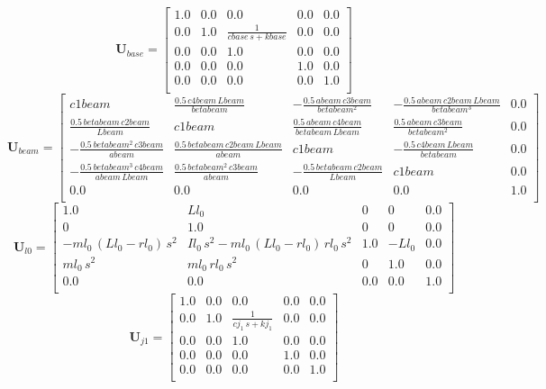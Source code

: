 \documentclass[12pt]{article}
\newcommand{\M}[1]{\mathbf{#1}}
\begin{document}
\begin{equation}
\M{U}_{base}= \left[ \begin{array}{ccccc}1.0&0.0&0.0&0.0&0.0\\ 0.0&1.0& \displaystyle \frac{1}{cbase\,s+kbase}& 0.0&0.0\\ 0.0&0.0&1.0&0.0&0.0\\ 0.0&0.0&0.0&1.0&0.0\\ 0.0&0.0&0.0 &0.0&1.0\\ \end{array} \right] 
\end{equation}
\begin{equation}
\M{U}_{beam}= \left[ \begin{array}{ccccc}c1beam& \displaystyle \frac{0.5\,c4beam\,Lbeam}{betabeam}&- \displaystyle \frac{0.5\,abeam \,c3beam}{betabeam^2}&- \displaystyle \frac{0.5\,abeam\,c2beam\,Lbeam}{ betabeam^3}&0.0\\  \displaystyle \frac{0.5\,betabeam\,c2beam}{Lbeam}&c1beam& \displaystyle \frac{ 0.5\,abeam\,c4beam}{betabeam\,Lbeam}& \displaystyle \frac{0.5\,abeam\,c3beam }{betabeam^2}&0.0\\ - \displaystyle \frac{0.5\,betabeam^2\,c3beam}{abeam}&  \displaystyle \frac{0.5\,betabeam\,c2beam\,Lbeam}{abeam}&c1beam&- \displaystyle \frac{0.5\,c4beam\, Lbeam}{betabeam}&0.0\\ - \displaystyle \frac{0.5\,betabeam^3\,c4beam}{abeam \,Lbeam}& \displaystyle \frac{0.5\,betabeam^2\,c3beam}{abeam}&- \displaystyle \frac{0.5\,betabeam\, c2beam}{Lbeam}&c1beam&0.0\\ 0.0&0.0&0.0&0.0&1.0\\ \end{array} \right] 
\end{equation}
\begin{equation}
\M{U}_{l0}= \left[ \begin{array}{ccccc}1.0&Ll_0&0&0&0.0\\ 0&1.0&0&0&0.0\\ -ml_0\,\left(Ll_0- rl_0\right)\,s^2&Il_0\,s^2-ml_0\,\left(Ll_0-rl_0\right)\,rl_0\,s^2& 1.0&-Ll_0&0.0\\ ml_0\,s^2&ml_0\,rl_0\,s^2&0&1.0&0.0\\ 0.0&0.0&0.0& 0.0&1.0\\ \end{array} \right] 
\end{equation}
\begin{equation}
\M{U}_{j1}= \left[ \begin{array}{ccccc}1.0&0.0&0.0&0.0&0.0\\ 0.0&1.0& \displaystyle \frac{1}{cj_1\,s+kj_1}& 0.0&0.0\\ 0.0&0.0&1.0&0.0&0.0\\ 0.0&0.0&0.0&1.0&0.0\\ 0.0&0.0&0.0 &0.0&1.0\\ \end{array} \right] 
\end{equation}
\end{document}
